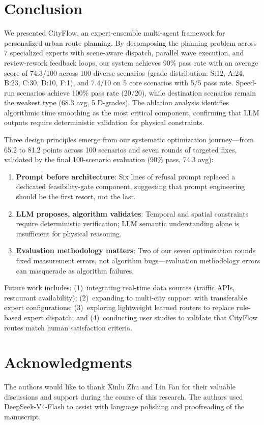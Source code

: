 \section{Conclusion}
\label{sec:conclusion}

We presented CityFlow, an expert-ensemble multi-agent framework for personalized urban route planning. By decomposing the planning problem across 7 specialized experts with scene-aware dispatch, parallel wave execution, and review-rework feedback loops, our system achieves 90\% pass rate with an average score of 74.3/100 across 100 diverse scenarios (grade distribution: S:12, A:24, B:23, C:30, D:10, F:1), and 7.4/10 on 5 core scenarios with 5/5 pass rate. Speed-run scenarios achieve 100\% pass rate (20/20), while destination scenarios remain the weakest type (68.3 avg, 5 D-grades). The ablation analysis identifies algorithmic time smoothing as the most critical component, confirming that LLM outputs require deterministic validation for physical constraints.

Three design principles emerge from our systematic optimization journey---from 65.2 to 81.2 points across 100 scenarios and seven rounds of targeted fixes, validated by the final 100-scenario evaluation (90\% pass, 74.3 avg):

\begin{enumerate}[leftmargin=*]
    \item \textbf{Prompt before architecture}: Six lines of refusal prompt replaced a dedicated feasibility-gate component, suggesting that prompt engineering should be the first resort, not the last.
    \item \textbf{LLM proposes, algorithm validates}: Temporal and spatial constraints require deterministic verification; LLM semantic understanding alone is insufficient for physical reasoning.
    \item \textbf{Evaluation methodology matters}: Two of our seven optimization rounds fixed measurement errors, not algorithm bugs---evaluation methodology errors can masquerade as algorithm failures.
\end{enumerate}

Future work includes: (1)~integrating real-time data sources (traffic APIs, restaurant availability); (2)~expanding to multi-city support with transferable expert configurations; (3)~exploring lightweight learned routers to replace rule-based expert dispatch; and (4)~conducting user studies to validate that CityFlow routes match human satisfaction criteria.

\section*{Acknowledgments}
The authors would like to thank Xinlu Zhu and Lin Fan for their valuable discussions and support during the course of this research. The authors used DeepSeek-V4-Flash to assist with language polishing and proofreading of the manuscript.
